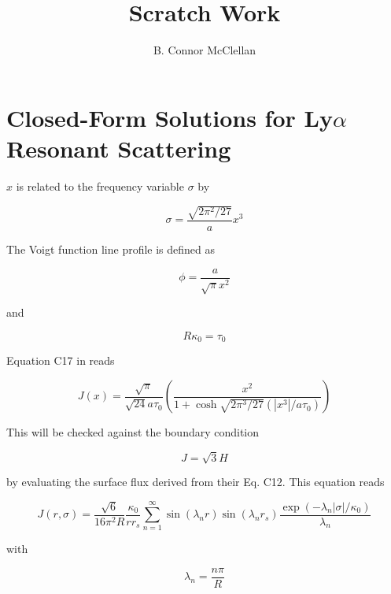 \documentclass[onecolumn]{aastex63}
\begin{document}
\title{Scratch Work}
\author{B. Connor McClellan}
\keywords{}

\setlength\parindent{0pt}

\section{Closed-Form Solutions for Ly$\alpha$ Resonant Scattering}

$x$ is related to the frequency variable $\sigma$ by 

\begin{equation} \label{sigma}
    \sigma = \frac{\sqrt{2\pi^2/27}}{a} x^3
\end{equation}

The Voigt function line profile is defined as 

\begin{equation} \label{lineprofile}
    \phi = \frac{a}{\sqrt{\pi} x^2}
\end{equation}

and

\begin{equation}
    R\kappa_0 = \tau_0
\end{equation}

Equation C17 in \citet{2006ApJ...649...14D} reads

\begin{equation} \label{dijkstra}
    J(x) = \frac{\sqrt{\pi}}{\sqrt{24}a\tau_0}\left(\frac{x^2}{1 + \cosh{\sqrt{2\pi^3/27}(|x^3|/a\tau_0)}}\right)
\end{equation}

This will be checked against the boundary condition

\begin{equation}
    J = \sqrt{3} H
\end{equation}

by evaluating the surface flux derived from their Eq. C12. This equation reads 

\begin{equation} \label{c12}
    J(r, \sigma) = \frac{\sqrt{6}}{16 \pi^2 R} \frac{\kappa_0}{rr_s} \sum_{n=1}^{\infty}\sin(\lambda_n r) \sin(\lambda_n r_s) \frac{\exp{(-\lambda_n |\sigma|/\kappa_0)}}{\lambda_n}
\end{equation}

with

\begin{equation}
    \lambda_n = \frac{n\pi}{R}
\end{equation}
\end{document}
